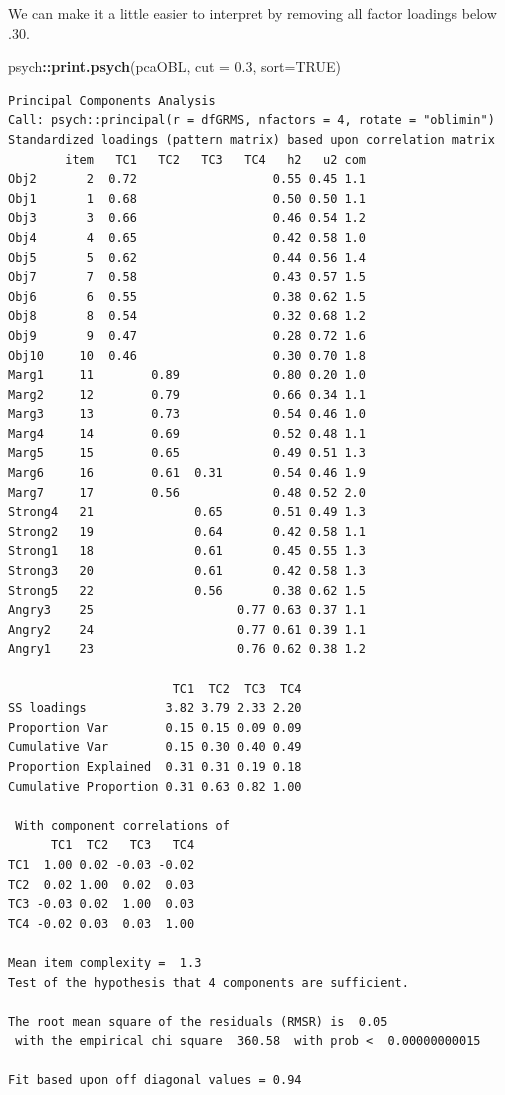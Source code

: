 \documentclass[
  english,
]{book}
\newenvironment{Shaded}{\begin{snugshade}}{\end{snugshade}}
\newcommand{\DataTypeTok}[1]{\textcolor[rgb]{0.13,0.29,0.53}{#1}}
\newcommand{\FloatTok}[1]{\textcolor[rgb]{0.00,0.00,0.81}{#1}}
\newcommand{\KeywordTok}[1]{\textcolor[rgb]{0.13,0.29,0.53}{\textbf{#1}}}
\newcommand{\NormalTok}[1]{#1}
\newcommand{\OperatorTok}[1]{\textcolor[rgb]{0.81,0.36,0.00}{\textbf{#1}}}
\newcommand{\OtherTok}[1]{\textcolor[rgb]{0.56,0.35,0.01}{#1}}
\begin{document}
We can make it a little easier to interpret by removing all factor loadings below .30.

\begin{Shaded}
\begin{Highlighting}[]
\NormalTok{psych}\OperatorTok{::}\KeywordTok{print.psych}\NormalTok{(pcaOBL, }\DataTypeTok{cut =} \FloatTok{0.3}\NormalTok{, }\DataTypeTok{sort=}\OtherTok{TRUE}\NormalTok{)}
\end{Highlighting}
\end{Shaded}

\begin{verbatim}
Principal Components Analysis
Call: psych::principal(r = dfGRMS, nfactors = 4, rotate = "oblimin")
Standardized loadings (pattern matrix) based upon correlation matrix
        item   TC1   TC2   TC3   TC4   h2   u2 com
Obj2       2  0.72                   0.55 0.45 1.1
Obj1       1  0.68                   0.50 0.50 1.1
Obj3       3  0.66                   0.46 0.54 1.2
Obj4       4  0.65                   0.42 0.58 1.0
Obj5       5  0.62                   0.44 0.56 1.4
Obj7       7  0.58                   0.43 0.57 1.5
Obj6       6  0.55                   0.38 0.62 1.5
Obj8       8  0.54                   0.32 0.68 1.2
Obj9       9  0.47                   0.28 0.72 1.6
Obj10     10  0.46                   0.30 0.70 1.8
Marg1     11        0.89             0.80 0.20 1.0
Marg2     12        0.79             0.66 0.34 1.1
Marg3     13        0.73             0.54 0.46 1.0
Marg4     14        0.69             0.52 0.48 1.1
Marg5     15        0.65             0.49 0.51 1.3
Marg6     16        0.61  0.31       0.54 0.46 1.9
Marg7     17        0.56             0.48 0.52 2.0
Strong4   21              0.65       0.51 0.49 1.3
Strong2   19              0.64       0.42 0.58 1.1
Strong1   18              0.61       0.45 0.55 1.3
Strong3   20              0.61       0.42 0.58 1.3
Strong5   22              0.56       0.38 0.62 1.5
Angry3    25                    0.77 0.63 0.37 1.1
Angry2    24                    0.77 0.61 0.39 1.1
Angry1    23                    0.76 0.62 0.38 1.2

                       TC1  TC2  TC3  TC4
SS loadings           3.82 3.79 2.33 2.20
Proportion Var        0.15 0.15 0.09 0.09
Cumulative Var        0.15 0.30 0.40 0.49
Proportion Explained  0.31 0.31 0.19 0.18
Cumulative Proportion 0.31 0.63 0.82 1.00

 With component correlations of 
      TC1  TC2   TC3   TC4
TC1  1.00 0.02 -0.03 -0.02
TC2  0.02 1.00  0.02  0.03
TC3 -0.03 0.02  1.00  0.03
TC4 -0.02 0.03  0.03  1.00

Mean item complexity =  1.3
Test of the hypothesis that 4 components are sufficient.

The root mean square of the residuals (RMSR) is  0.05 
 with the empirical chi square  360.58  with prob <  0.00000000015 

Fit based upon off diagonal values = 0.94
\end{verbatim}
\end{document}
